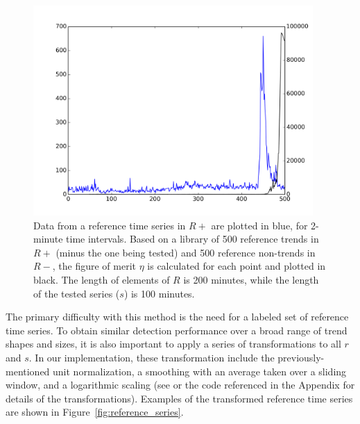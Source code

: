 \documentclass{article}
\begin{document}
\begin{figure}
\begin{center}
\includegraphics[width=0.95\textwidth]{fig/nikolov.png} 
\caption{Data from a reference time series in $R+$ are plotted in blue, for
2-minute time intervals. Based on a library of 500 reference trends in $R+$
(minus the one being tested) and 500 reference non-trends in $R-$, the figure of
merit $\eta$ is calculated for each point and plotted in black. The length of
elements of $R$ is 200 minutes, while the length of the tested series ($s$) is 100
minutes. 
}
\label{fig:nikolov_eta} 
\end{center}
\end{figure}

The primary difficulty with this method is the need for a labeled set of reference time
series. To obtain similar detection performance over a broad range of trend shapes and sizes, 
it is also important to apply a series of transformations to all $r$ and $s$.
In our implementation, these transformation include the previously-mentioned unit normalization, 
a smoothing with an average taken over a sliding window,
and a logarithmic scaling
(see \cite{Nikolov:2011} or the code referenced in the Appendix
for details of the transformations). 
Examples of the transformed reference time series are shown in Figure~\ref{fig:reference_series}.
\end{document}
